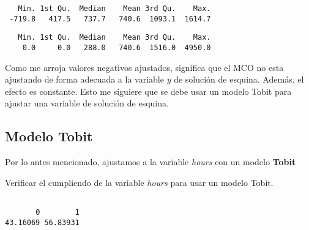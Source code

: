 \documentclass[
  letterpaper,
  DIV=11,
  numbers=noendperiod]{scrreprt}
\newenvironment{Shaded}{\begin{snugshade}}{\end{snugshade}}
\newcommand{\CommentTok}[1]{\textcolor[rgb]{0.37,0.37,0.37}{#1}}
\newcommand{\DecValTok}[1]{\textcolor[rgb]{0.68,0.00,0.00}{#1}}
\newcommand{\FunctionTok}[1]{\textcolor[rgb]{0.28,0.35,0.67}{#1}}
\newcommand{\NormalTok}[1]{\textcolor[rgb]{0.00,0.23,0.31}{#1}}
\newcommand{\OtherTok}[1]{\textcolor[rgb]{0.00,0.23,0.31}{#1}}
\newcommand{\SpecialCharTok}[1]{\textcolor[rgb]{0.37,0.37,0.37}{#1}}
\begin{document}
\begin{verbatim}
   Min. 1st Qu.  Median    Mean 3rd Qu.    Max. 
 -719.8   417.5   737.7   740.6  1093.1  1614.7 
\end{verbatim}

\begin{Shaded}
\end{Shaded}

\begin{verbatim}
   Min. 1st Qu.  Median    Mean 3rd Qu.    Max. 
    0.0     0.0   288.0   740.6  1516.0  4950.0 
\end{verbatim}

Como me arroja valores negativos ajustados, significa que el MCO no esta
ajustando de forma adecuada a la variable \(y\) de solución de esquina.
Además, el efecto es constante. Esto me siguiere que se debe usar un
modelo Tobit para ajustar una variable de solución de esquina.

\subsection{Modelo Tobit}\label{modelo-tobit-1}

Por lo antes mencionado, ajustamos a la variable \emph{hours} con un
modelo \textbf{Tobit}

Verificar el cumpliendo de la variable \emph{hours} para usar un modelo
Tobit.

\begin{Shaded}
\end{Shaded}

\begin{verbatim}

       0        1 
43.16069 56.83931 
\end{verbatim}
\end{document}
